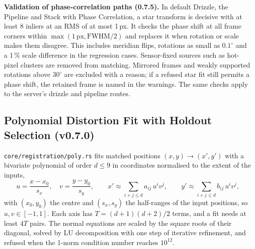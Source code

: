 \documentclass[11pt,a4paper]{article}
\newcommand{\code}[1]{\texttt{\small #1}}
\begin{document}
    \textbf{Validation of phase-correlation paths (0.7.5).} In default Drizzle, the Pipeline and Stack with Phase Correlation, a star transform is decisive with at least 8 inliers at an RMS of at most 1\,px. It checks the phase shift at all frame corners within $\max(1\,\mathrm{px},\mathrm{FWHM}/2)$ and replaces it when rotation or scale makes them disagree. This includes meridian flips, rotations as small as $0.1^{\circ}$ and a 1\,\% scale difference in the regression cases. Sensor-fixed sources such as hot-pixel clusters are removed from matching. Mirrored frames and weakly supported rotations above $30^{\circ}$ are excluded with a reason; if a refused star fit still permits a phase shift, the retained frame is named in the warnings. The same checks apply to the server's drizzle and pipeline routes.

    \subsection{Polynomial Distortion Fit with Holdout Selection (v0.7.0)}
    \label{sec:poly_math}

    \code{core/registration/poly.rs} fits matched positions $(x, y) \to (x', y')$ with a bivariate polynomial of order $d \le 9$ in coordinates normalised to the extent of the inputs,
    \begin{equation}
        u = \frac{x - x_0}{s_x}, \quad v = \frac{y - y_0}{s_y}, \qquad
        x' \approx \sum_{i + j \le d} a_{ij}\, u^i v^j, \qquad y' \approx \sum_{i + j \le d} b_{ij}\, u^i v^j,
    \end{equation}
    with $(x_0, y_0)$ the centre and $(s_x, s_y)$ the half-ranges of the input positions, so $u, v \in [-1, 1]$. Each axis has $T = (d+1)(d+2)/2$ terms, and a fit needs at least $4T$ pairs. The normal equations are scaled by the square roots of their diagonal, solved by LU decomposition with one step of iterative refinement, and refused when the 1-norm condition number reaches $10^{12}$.
\end{document}
